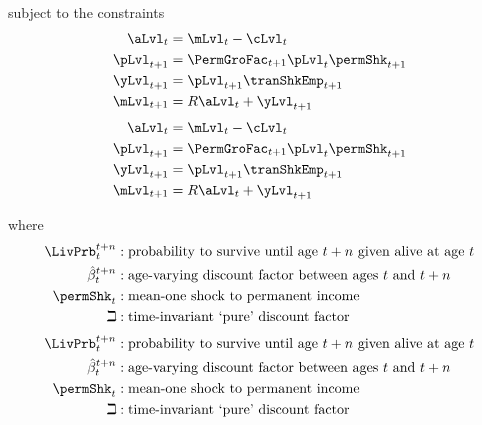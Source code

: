 \documentclass[titlepage, headings=optiontotocandhead]{econark}
\begin{document}
{subject to the constraints
  \begin{equation*}\begin{gathered}\begin{aligned}
        \aLvl_{t}  & = \mLvl_{t}-\cLvl_{t}
        \\      \pLvl_{t+1}  & = \PermGroFac_{t+1}\pLvl_{t}\permShk_{t+1}
        \\      \yLvl_{t+1}  & = \pLvl_{t+1}\tranShkEmp _{t+1}
        \\      \mLvl_{t+1}  & = R \aLvl_{t}+\yLvl_{t+1}
      \end{aligned}\end{gathered}\end{equation*}
  \begin{equation*}\begin{gathered}\begin{aligned}
        \aLvl_{t}  & = \mLvl_{t}-\cLvl_{t}
        \\      \pLvl_{t+1}  & = \PermGroFac_{t+1}\pLvl_{t}\permShk_{t+1}
        \\      \yLvl_{t+1}  & = \pLvl_{t+1}\tranShkEmp _{t+1}
        \\      \mLvl_{t+1}  & = R \aLvl_{t}+\yLvl_{t+1}
      \end{aligned}\end{gathered}\end{equation*}
 
where
  \begin{equation*}\begin{gathered}\begin{aligned}
        \LivPrb _{t}^{t+n} &:\text{probability to survive until age $t+n$ given alive at age $t$}
        \\      \hat{\beta}_{t}^{t+n} &:\text{age-varying discount factor between ages $t$ and $t+n$}
        \\     \permShk_{t} &:\text{mean-one shock to permanent income}
        \\     \beth &:\text{time-invariant `pure' discount factor}
      \end{aligned}\end{gathered}\end{equation*}
  \begin{equation*}\begin{gathered}\begin{aligned}
        \LivPrb _{t}^{t+n} &:\text{probability to survive until age $t+n$ given alive at age $t$}
        \\      \hat{\beta}_{t}^{t+n} &:\text{age-varying discount factor between ages $t$ and $t+n$}
        \\     \permShk_{t} &:\text{mean-one shock to permanent income}
        \\     \beth &:\text{time-invariant `pure' discount factor}
      \end{aligned}\end{gathered}\end{equation*}

}
\end{document}
